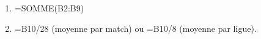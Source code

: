 \begin{enumerate}
\item %

=SOMME(B2:B9)
\item %
=B10/28 (moyenne par match) ou =B10/8 (moyenne par ligue).
\end{enumerate}
 
\bigskip

